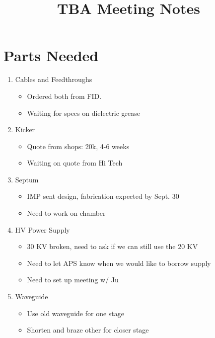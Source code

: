 \documentclass[12pt]{article}
\title{\vspace{-4ex}TBA Meeting Notes\vspace{-4ex}}
\begin{document}
\maketitle

\section*{Parts Needed}
\begin{enumerate}
	\item Cables and Feedthroughs
	\begin{itemize}
		\item Ordered both from FID. 
		\item Waiting for specs on dielectric grease
	\end{itemize}

	\item Kicker 
	\begin{itemize}
		\item Quote from shops: 20k, 4-6 weeks
		\item Waiting on quote from Hi Tech
	\end{itemize}

	\item Septum
	\begin{itemize}
		\item IMP sent design, fabrication expected by Sept. 30
		\item Need to work on chamber
	\end{itemize}
	\item HV Power Supply
	\begin{itemize}
		\item 30 KV broken, need to ask if we can still use the 20 KV
		\item Need to let APS know when we would like to borrow supply
		\item Need to set up meeting w/ Ju
	\end{itemize}
	
	\item Waveguide
	\begin{itemize}
		\item Use old waveguide for one stage
		\item Shorten and braze other for closer stage
	\end{itemize}

\end{enumerate}
\end{document}
